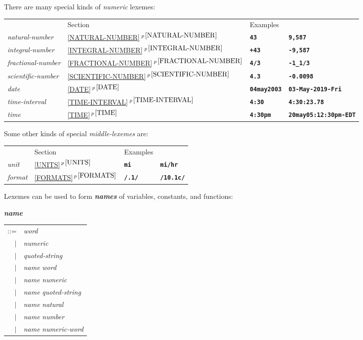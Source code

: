 \documentclass[12pt]{article}
\makeatletter
\newcommand{\TT}[1]{{\tt \bfseries #1}}
\newcommand{\skey}[2]{{\bf \em #1#2}\index{#1}}
\newcommand{\emkey}[1]{{\bf \em #1}\index{#1@{\em #1}}}
\newcommand{\itemref}[1]{\ref{#1}$\,^{p\,\pageref{#1}}$}
\newenvironment{indpar}[1][0.3in]%
	{\begin{list}{}%
		     {\setlength{\itemsep}{0in}%
		      \setlength{\topsep}{0in}%
		      \setlength{\parsep}{1ex}%
		      \setlength{\labelwidth}{#1}%
		      \setlength{\leftmargin}{#1}%
		      \addtolength{\leftmargin}{\labelsep}}%
	 \item}%
	{\end{list}}
\makeatother
\begin{document}
There are many special kinds of {\em numeric} lexemes:
\begin{indpar}
    \begin{tabular}[t]{l@{~~~~~}lll}
          & Section & Examples \\[1ex]
      {\em natural-number}
    & \itemref{NATURAL-NUMBER}
    & \TT{43} 
    & \TT{9,587} \\
      {\em integral-number}
    & \itemref{INTEGRAL-NUMBER}
    & \TT{+43} 
    & \TT{-9,587} \\
      {\em fractional-number}
    & \itemref{FRACTIONAL-NUMBER}
    & \TT{4/3}
    & \TT{-1\_1/3} \\
      {\em scientific-number}
    & \itemref{SCIENTIFIC-NUMBER}
    & \TT{4.3}
    & \TT{-0.0098} \\
      {\em date}
    & \itemref{DATE}
    & \TT{04may2003}
    & \TT{03-May-2019-Fri} \\
      {\em time-interval}
    & \itemref{TIME-INTERVAL}
    & \TT{4:30}
    & \TT{4:30:23.78} \\
      {\em time}
    & \itemref{TIME}
    & \TT{4:30pm}
    & \TT{20may05:12:30pm-EDT} \\
    \end{tabular}
\end{indpar}

Some other kinds of special {\em middle-lexemes} are:
\begin{indpar}
    \begin{tabular}[t]{l@{~~~~~~~~~~~~~~~}lll}
          & Section & Examples \\[1ex]
      {\em unit}
    & \itemref{UNITS}
    & \TT{mi}
    & \TT{mi/hr} \\
      {\em format}
    & \itemref{FORMATS}
    & \TT{/.1/}
    & \TT{/10.1c/} \\
    \end{tabular}
\end{indpar}

Lexemes can be used to form \skey{name}s of variables,
constants, and functions:

\begin{indpar}
\emkey{name}\label{NAME} \begin{tabular}[t]{rl}
	::= & {\em word} \\
	$|$ & {\em numeric} \\
	$|$ & {\em quoted-string} \\
	$|$ & {\em name} {\em word} \\
	$|$ & {\em name} {\em numeric} \\
	$|$ & {\em name} {\em quoted-string} \\
	$|$ & {\em name} {\em natural} \\
	$|$ & {\em name} {\em number} \\
	$|$ & {\em name} {\em numeric-word}
    \end{tabular}
\end{indpar}
\end{document}
